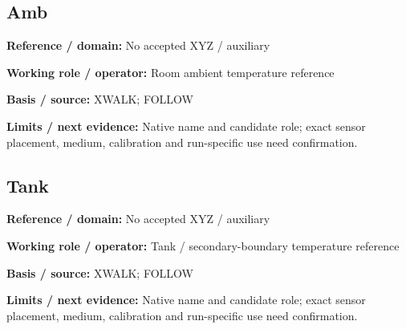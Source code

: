 \documentclass[11pt]{article}
\begin{document}
\par\noindent\begin{minipage}{\textwidth}\small\setlength{\parskip}{2pt}
\subsection*{Amb}
\textbf{Reference / domain:} No accepted XYZ / auxiliary\par
\textbf{Working role / operator:} Room ambient temperature reference\par
\textbf{Basis / source:} XWALK; FOLLOW\par
\textbf{Limits / next evidence:} Native name and candidate role; exact sensor placement, medium, calibration and run-specific use need confirmation.\par
\end{minipage}\par\vspace{5pt}
\par\noindent\begin{minipage}{\textwidth}\small\setlength{\parskip}{2pt}
\subsection*{Tank}
\textbf{Reference / domain:} No accepted XYZ / auxiliary\par
\textbf{Working role / operator:} Tank / secondary-boundary temperature reference\par
\textbf{Basis / source:} XWALK; FOLLOW\par
\textbf{Limits / next evidence:} Native name and candidate role; exact sensor placement, medium, calibration and run-specific use need confirmation.\par
\end{minipage}\par\vspace{5pt}
\end{document}
